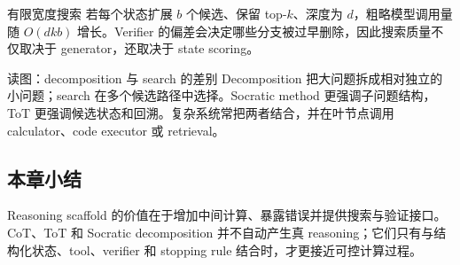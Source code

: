 
\begin{importantbox}{有限宽度搜索}
若每个状态扩展 $b$ 个候选、保留 top-$k$、深度为 $d$，粗略模型调用量随 $O(dkb)$ 增长。Verifier 的偏差会决定哪些分支被过早删除，因此搜索质量不仅取决于 generator，还取决于 state scoring。
\end{importantbox}


\begin{knowledgebox}{读图：decomposition 与 search 的差别}
Decomposition 把大问题拆成相对独立的小问题；search 在多个候选路径中选择。Socratic method 更强调子问题结构，ToT 更强调候选状态和回溯。复杂系统常把两者结合，并在叶节点调用 calculator、code executor 或 retrieval。
\end{knowledgebox}

\subsection{本章小结}

Reasoning scaffold 的价值在于增加中间计算、暴露错误并提供搜索与验证接口。CoT、ToT 和 Socratic decomposition 并不自动产生真 reasoning；它们只有与结构化状态、tool、verifier 和 stopping rule 结合时，才更接近可控计算过程。

